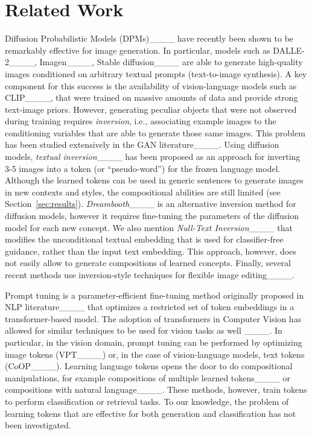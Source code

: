 \section{Related Work}
Diffusion Probabilistic Models (DPMs)____ have recently been shown to be remarkably effective for image generation. In particular, models such as DALLE-2____, Imagen____, Stable diffusion____ are able to generate high-quality images conditioned on arbitrary textual prompts (text-to-image synthesis). A key component for this success is the availability of vision-language models such as CLIP____, that were trained on massive amounts of data and provide strong text-image priors. However, generating peculiar objects that were not observed during training requires \emph{inversion}, i.e., associating example images to the conditioning variables that are able to generate those same images. This problem has been studied extensively in the GAN literature____. Using diffusion models, \emph{textual inversion}____ has been proposed as an approach for inverting 3-5 images into a token (or ``pseudo-word'') for the frozen language model. Although the learned tokens can be used in generic sentences to generate images in new contexts and styles, the compositional abilities are still limited (see Section~\ref{sec:results}). \emph{Dreambooth}____ is an alternative inversion method for diffusion models, however it requires fine-tuning the parameters of the diffusion model for each new concept. We also mention \emph{Null-Text Inversion}____ that modifies the unconditional textual embedding that is used for classifier-free guidance, rather than the input text embedding. This approach, however, does not easily allow to generate compositions of learned concepts. Finally, several recent methods use inversion-style techniques for flexible image editing____.

Prompt tuning is a parameter-efficient fine-tuning method originally proposed in NLP literature____ that optimizes a restricted set of token embeddings in a transformer-based model. The adoption of transformers in Computer Vision has allowed for similar techniques to be used for vision tasks as well ____. In particular, in the vision domain, prompt tuning can be performed by optimizing image tokens (VPT____) or, in the case of vision-language models, text tokens (CoOP____). Learning language tokens opens the door to do compositional manipulations, for example compositions of multiple learned tokens____ or compositions with natural language____. These methods, however, train tokens to perform classification or retrieval tasks. To our knowledge, the problem of learning tokens that are effective for both generation and classification has not been investigated.


